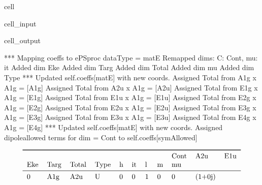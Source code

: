 \documentclass[letterpaper,table,10pt,english]{jupyterBook}
\begin{document}
\begin{sphinxuseclass}{cell}
\begin{sphinxVerbatimInput}
\begin{sphinxuseclass}{cell_input}
\begin{sphinxVerbatim}[commandchars=\\\{\}]
\PYG{p}{[}\PYG{p}{]}\PYG{p}{[}\PYG{p}{]}
\end{sphinxVerbatim}

\end{sphinxuseclass}\end{sphinxVerbatimInput}
\begin{sphinxVerbatimOutput}

\begin{sphinxuseclass}{cell_output}
\begin{sphinxVerbatim}[commandchars=\\\{\}]
*** Mapping coeffs to ePSproc dataType = matE
Remapped dims: \PYGZob{}\PYGZsq{}C\PYGZsq{}: \PYGZsq{}Cont\PYGZsq{}, \PYGZsq{}mu\PYGZsq{}: \PYGZsq{}it\PYGZsq{}\PYGZcb{}
Added dim Eke
Added dim Targ
Added dim Total
Added dim mu
Added dim Type
*** Updated self.coeffs[\PYGZsq{}matE\PYGZsq{}] with new coords.
Assigned \PYGZsq{}Total\PYGZsq{} from A1g x A1g = [\PYGZsq{}A1g\PYGZsq{}]
Assigned \PYGZsq{}Total\PYGZsq{} from A2u x A1g = [\PYGZsq{}A2u\PYGZsq{}]
Assigned \PYGZsq{}Total\PYGZsq{} from E1g x A1g = [\PYGZsq{}E1g\PYGZsq{}]
Assigned \PYGZsq{}Total\PYGZsq{} from E1u x A1g = [\PYGZsq{}E1u\PYGZsq{}]
Assigned \PYGZsq{}Total\PYGZsq{} from E2g x A1g = [\PYGZsq{}E2g\PYGZsq{}]
Assigned \PYGZsq{}Total\PYGZsq{} from E2u x A1g = [\PYGZsq{}E2u\PYGZsq{}]
Assigned \PYGZsq{}Total\PYGZsq{} from E3g x A1g = [\PYGZsq{}E3g\PYGZsq{}]
Assigned \PYGZsq{}Total\PYGZsq{} from E3u x A1g = [\PYGZsq{}E3u\PYGZsq{}]
Assigned \PYGZsq{}Total\PYGZsq{} from E4g x A1g = [\PYGZsq{}E4g\PYGZsq{}]
*** Updated self.coeffs[\PYGZsq{}matE\PYGZsq{}] with new coords.
Assigned dipole\PYGZhy{}allowed terms for dim = \PYGZsq{}Cont\PYGZsq{} to self.coeffs[\PYGZsq{}symAllowed\PYGZsq{}]
\end{sphinxVerbatim}
\begin{equation*}
\begin{split}\begin{tabular}{lllllllllll}
\toprule
  &     &     &   &   &   &   &    & Cont &     A2u &                       E1u \\
Eke & Targ & Total & Type & h & it & l & m & mu &         &                           \\
\midrule
0 & A1g & A2u & U & 0 & 0 & 1 &  0 &  0 &  (1+0j) &                           \\

\end{tabular}
\end{split}
\end{equation*}
\end{sphinxuseclass}
\end{sphinxVerbatimOutput}
\end{sphinxuseclass}
\end{document}
